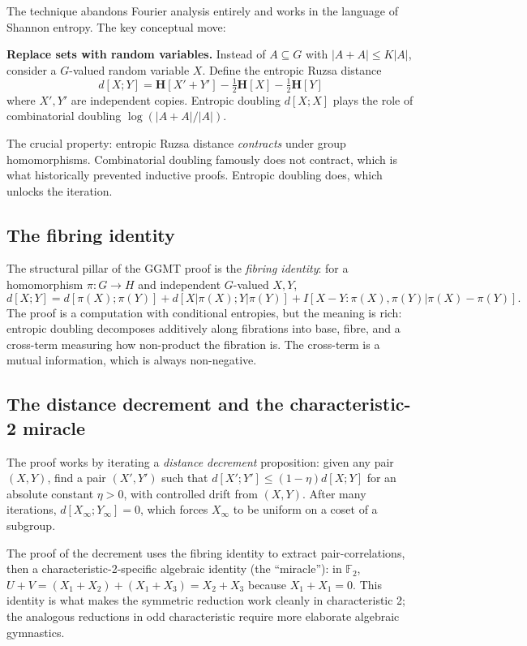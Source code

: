 \documentclass[11pt,a4paper]{article}
\theoremstyle{plain}
\theoremstyle{definition}
\theoremstyle{remark}
\newcommand{\F}{\mathbb{F}}
\newcommand{\entropy}{\mathbf{H}}
\newcommand{\dist}{d}
\begin{document}
The technique abandons Fourier analysis entirely and works in the language of Shannon entropy. The key conceptual move:

\textbf{Replace sets with random variables.} Instead of $A \subseteq G$ with $|A + A| \leq K|A|$, consider a $G$-valued random variable $X$. Define the entropic Ruzsa distance
\[
\dist[X; Y] = \entropy[X' + Y'] - \tfrac{1}{2}\entropy[X] - \tfrac{1}{2}\entropy[Y]
\]
where $X', Y'$ are independent copies. Entropic doubling $\dist[X; X]$ plays the role of combinatorial doubling $\log(|A+A|/|A|)$.

The crucial property: entropic Ruzsa distance \emph{contracts} under group homomorphisms. Combinatorial doubling famously does not contract, which is what historically prevented inductive proofs. Entropic doubling does, which unlocks the iteration.

\subsection{The fibring identity}

The structural pillar of the GGMT proof is the \emph{fibring identity}: for a homomorphism $\pi: G \to H$ and independent $G$-valued $X, Y$,
\[
\dist[X; Y] = \dist[\pi(X); \pi(Y)] + \dist[X | \pi(X); Y | \pi(Y)] + I[X - Y : \pi(X), \pi(Y) | \pi(X) - \pi(Y)].
\]
The proof is a computation with conditional entropies, but the meaning is rich: entropic doubling decomposes additively along fibrations into base, fibre, and a cross-term measuring how non-product the fibration is. The cross-term is a mutual information, which is always non-negative.

\subsection{The distance decrement and the characteristic-2 miracle}

The proof works by iterating a \emph{distance decrement} proposition: given any pair $(X, Y)$, find a pair $(X', Y')$ such that $\dist[X'; Y'] \leq (1 - \eta) \dist[X; Y]$ for an absolute constant $\eta > 0$, with controlled drift from $(X, Y)$. After many iterations, $\dist[X_\infty; Y_\infty] = 0$, which forces $X_\infty$ to be uniform on a coset of a subgroup.

The proof of the decrement uses the fibring identity to extract pair-correlations, then a characteristic-2-specific algebraic identity (the ``miracle''): in $\F_2$, $U + V = (X_1 + X_2) + (X_1 + X_3) = X_2 + X_3$ because $X_1 + X_1 = 0$. This identity is what makes the symmetric reduction work cleanly in characteristic 2; the analogous reductions in odd characteristic require more elaborate algebraic gymnastics.
\end{document}

